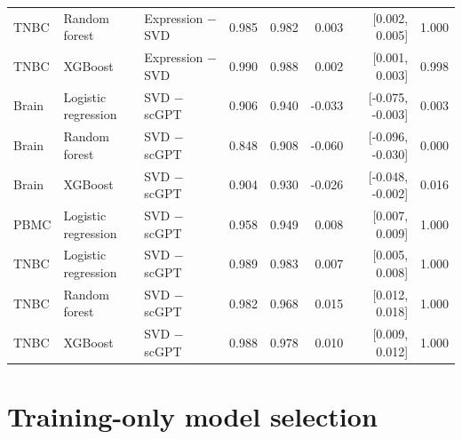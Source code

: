 {\begin{longtable}{lllrrrrr}
TNBC & Random forest & Expression $-$ SVD & 0.985 & 0.982 & 0.003 & [0.002, 0.005] & 1.000 \\
TNBC & XGBoost & Expression $-$ SVD & 0.990 & 0.988 & 0.002 & [0.001, 0.003] & 0.998 \\
Brain & Logistic regression & SVD $-$ scGPT & 0.906 & 0.940 & -0.033 & [-0.075, -0.003] & 0.003 \\
Brain & Random forest & SVD $-$ scGPT & 0.848 & 0.908 & -0.060 & [-0.096, -0.030] & 0.000 \\
Brain & XGBoost & SVD $-$ scGPT & 0.904 & 0.930 & -0.026 & [-0.048, -0.002] & 0.016 \\
PBMC & Logistic regression & SVD $-$ scGPT & 0.958 & 0.949 & 0.008 & [0.007, 0.009] & 1.000 \\
TNBC & Logistic regression & SVD $-$ scGPT & 0.989 & 0.983 & 0.007 & [0.005, 0.008] & 1.000 \\
TNBC & Random forest & SVD $-$ scGPT & 0.982 & 0.968 & 0.015 & [0.012, 0.018] & 1.000 \\
TNBC & XGBoost & SVD $-$ scGPT & 0.988 & 0.978 & 0.010 & [0.009, 0.012] & 1.000 \\
\end{longtable}
}

\clearpage\section{Training-only model selection}

